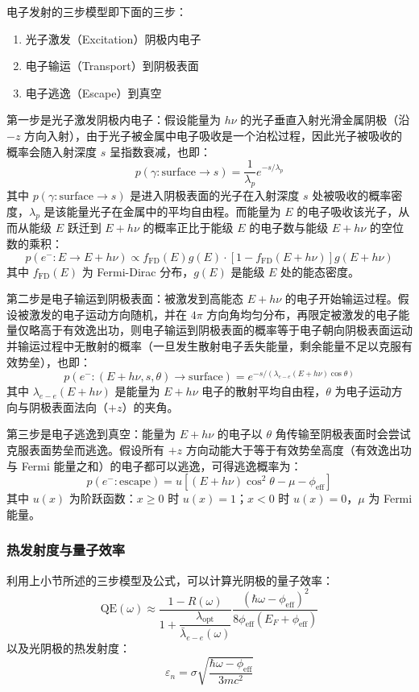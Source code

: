电子发射的三步模型即下面的三步：
	\begin{enumerate}
	\item 光子激发（Excitation）阴极内电子
	\item 电子输运（Transport）到阴极表面
	\item 电子逃逸（Escape）到真空
	\end{enumerate}
	
第一步是光子激发阴极内电子：假设能量为 $h\nu$ 的光子垂直入射光滑金属阴极（沿 $-z$ 方向入射），由于光子被金属中电子吸收是一个泊松过程，因此光子被吸收的概率会随入射深度 $s$ 呈指数衰减，也即：
	\[
	p(\gamma: \mathrm{surface} \to s) = \frac{1}{\lambda_p}e^{-s/\lambda_p}
	\]
	其中 $p(\gamma: \mathrm{surface} \to s)$ 是进入阴极表面的光子在入射深度 $s$ 处被吸收的概率密度，$\lambda_p$ 是该能量光子在金属中的平均自由程。而能量为 $E$ 的电子吸收该光子，从而从能级 $E$ 跃迁到 $E+h\nu$ 的概率正比于能级 $E$ 的电子数与能级 $E+h\nu$ 的空位数的乘积：
	\[
	p(e^{-}: E\to E+h\nu) \propto f_{\mathrm{FD}}(E)g(E)\cdot [1-f_{\mathrm{FD}}(E+h\nu)]g(E+h\nu)
	\]
	其中 $f_{\mathrm{FD}}(E)$ 为 Fermi-Dirac 分布，$g(E)$ 是能级 $E$ 处的能态密度。
	
第二步是电子输运到阴极表面：被激发到高能态 $E+h\nu$ 的电子开始输运过程。假设被激发的电子运动方向随机，并在 $4\pi$ 方向角均匀分布，再限定被激发的电子能量仅略高于有效逸出功，则电子输运到阴极表面的概率等于电子朝向阴极表面运动并输运过程中无散射的概率（一旦发生散射电子丢失能量，剩余能量不足以克服有效势垒），也即：
	\[
	p(e^{-}: (E+h\nu, s, \theta) \to \mathrm{surface}) = e^{-s/(\lambda_{e-e}(E+h\nu)\cos\theta)}
	\]
	其中 $\lambda_{e-e}(E+h\nu)$ 是能量为 $E+h\nu$ 电子的散射平均自由程，$\theta$ 为电子运动方向与阴极表面法向（$+z$）的夹角。
	
第三步是电子逃逸到真空：能量为 $E+h\nu$ 的电子以 $\theta$ 角传输至阴极表面时会尝试克服表面势垒而逃逸。假设所有 $+z$ 方向动能大于等于有效势垒高度（有效逸出功与 Fermi 能量之和）的电子都可以逃逸，可得逃逸概率为：
	\[
	p(e^{-}: \mathrm{escape}) = u[(E+h\nu)\cos^2\theta-\mu-\phi_{\mathrm{eff}}]
	\]
	其中 $u(x)$ 为阶跃函数：$x\ge 0$ 时 $u(x)=1$；$x<0$ 时 $u(x)=0$，$\mu$ 为 Fermi 能量。

\subsubsection{热发射度与量子效率}
利用上小节所述的三步模型及公式，可以计算光阴极的量子效率\cite{Dowell:2009ab}：
\begin{equation}
	\mathrm{QE}(\omega) \approx\dfrac{1-R(\omega)}{1+\dfrac{\lambda_{\mathrm{opt}}}{\bar{\lambda}_{e-e}(\omega)}}\frac{(\hbar\omega-\phi_{\mathrm{eff}})^2}{8\phi_{\mathrm{eff}}(E_F+\phi_{\mathrm{eff}})}
\end{equation}
以及光阴极的热发射度\cite{Dowell:2009ab}：
\begin{equation}
	\varepsilon_{n} =\sigma\sqrt{\dfrac{\hbar\omega-\phi_{\mathrm{eff}}}{3mc^2}}
	\label{eq:emit-dowell}
\end{equation}

